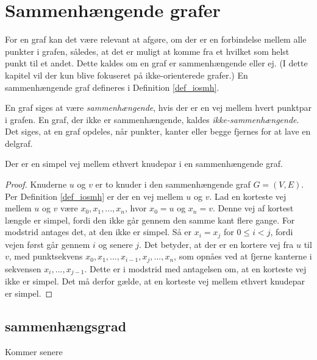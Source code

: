 \section{Sammenhængende grafer}
For en graf kan det være relevant at afgøre, om der er en forbindelse mellem alle punkter i grafen, således, at det er muligt at komme fra et hvilket som helst punkt til et andet. Dette kaldes om en graf er sammenhængende eller ej.
(I dette kapitel vil der kun blive fokuseret på ikke-orienterede grafer.)
En sammenhængende graf defineres i Definition \ref{def_iosmh}.

\begin{defn}
\label{def_iosmh}
En graf siges at være \textit{sammenhængende}, hvis der er en vej mellem hvert punktpar i grafen. 
En graf, der ikke er sammenhængende, kaldes \textit{ikke-sammenhængende}.
Det siges, at en graf opdeles, når punkter, kanter eller begge fjernes for at lave en delgraf. 
\end{defn}


\begin{thm}
Der er en simpel vej mellem ethvert knudepar i en sammenhængende graf.
\label{smh_satning}
\end{thm}

\begin{proof}
Knuderne $u$ og $v$ er to knuder i den sammenhængende graf $G=(V,E)$.
Per Definition \ref{def_iosmh} er der en vej mellem $u$ og $v$.
Lad en korteste vej mellem $u$ og $v$ være $x_0,x_1,...,x_n$, hvor $x_0=u$ og $x_n=v$.
Denne vej af kortest længde er simpel, fordi den ikke går gennem den samme kant flere gange. 
For modstrid antages det, at den ikke er simpel. 
Så er $x_i=x_j$ for $0 \leq i < j$, fordi vejen først går gennem $i$ og senere $j$.
Det betyder, at der er en kortere vej fra $u$ til $v$, med punktsekvens $x_0,x_1,...,x_{i-1},x_j,...,x_n$, som opnåes ved at fjerne kanterne i sekvensen $x_i,...,x_{j-1}$.
Dette er i modstrid med antagelsen om, at en korteste vej ikke er simpel.
Det må derfor gælde, at en korteste vej mellem ethvert knudepar er simpel. 
\end{proof}

\subsection{sammenhængsgrad}
Kommer senere

